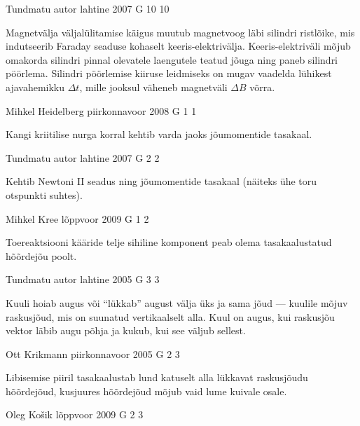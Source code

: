 \documentclass[11pt, twoside]{article}
\begin{document}
{%
{Tundmatu autor} %
{lahtine} %
{2007} %
{G 10} %
{10} %
{

\ifHint
Magnetvälja väljalülitamise käigus muutub magnetvoog läbi silindri ristlõike, mis indutseerib Faraday seaduse kohaselt keeris-elektrivälja. Keeris-elektriväli mõjub omakorda silindri pinnal olevatele laengutele teatud jõuga ning paneb silindri pöörlema. Silindri pöörlemise kiiruse leidmiseks on mugav vaadelda lühikest ajavahemikku $\Delta t$, mille jooksul väheneb magnetväli $\Delta B$ võrra.
\fi
}

{Mihkel Heidelberg} %
{piirkonnavoor} %
{2008} %
{G 1} %
{1} %
{

\ifHint
Kangi kriitilise nurga korral kehtib varda jaoks jõumomentide tasakaal.
\fi
}

{Tundmatu autor} %
{lahtine} %
{2007} %
{G 2} %
{2} %
{

\ifHint
Kehtib Newtoni II seadus ning jõumomentide tasakaal (näiteks ühe toru otspunkti suhtes).
\fi
}

{Mihkel Kree} %
{lõppvoor} %
{2009} %
{G 1} %
{2} %
{

\ifHint
Toereaktsiooni kääride telje sihiline komponent peab olema tasakaalustatud hõõrdejõu poolt.
\fi
}

{Tundmatu autor} %
{lahtine} %
{2005} %
{G 3} %
{3} %
{

\ifHint
Kuuli hoiab augus või \enquote{lükkab} august välja üks ja sama jõud --- kuulile mõjuv raskusjõud, mis on suunatud vertikaalselt alla. Kuul on augus, kui raskusjõu vektor läbib augu põhja ja kukub, kui see väljub sellest.
\fi
}

{Ott Krikmann} %
{piirkonnavoor} %
{2005} %
{G 2} %
{3} %
{

\ifHint
Libisemise piiril tasakaalustab lund katuselt alla lükkavat raskusjõudu hõõrdejõud, kusjuures hõõrdejõud mõjub vaid lume kuivale osale.
\fi
}

{Oleg Košik} %
{lõppvoor} %
{2009} %
{G 2} %
{3} %
{

}}
\end{document}
